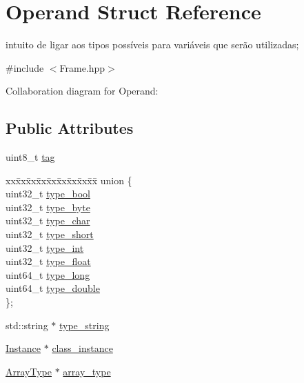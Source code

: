 \hypertarget{struct_operand}{}\section{Operand Struct Reference}
\label{struct_operand}


intuito de ligar aos tipos possíveis para variáveis que serão utilizadas;  




{\ttfamily \#include $<$Frame.\+hpp$>$}



Collaboration diagram for Operand\+:
\subsection*{Public Attributes}
\begin{DoxyCompactItemize}
\item 
uint8\+\_\+t \hyperlink{struct_operand_a551b2888783546b27f90b70f5ceeafee}{tag}
\item 
\begin{tabbing}
xx\=xx\=xx\=xx\=xx\=xx\=xx\=xx\=xx\=\kill
union \{\\
\>uint32\_t \hyperlink{struct_operand_a0705136abc78d06866591f4a1304163b}{type\_bool}\\
\>uint32\_t \hyperlink{struct_operand_a8590d48387a47c99940dec06f4262c88}{type\_byte}\\
\>uint32\_t \hyperlink{struct_operand_a7d323bb935c240911633677c632d967b}{type\_char}\\
\>uint32\_t \hyperlink{struct_operand_a9a95367e26a5d3016da0b6d9fc9f0359}{type\_short}\\
\>uint32\_t \hyperlink{struct_operand_a5aa568fddb9132272a9c4e9870825a13}{type\_int}\\
\>uint32\_t \hyperlink{struct_operand_a323c9442608ba57c5556a67dece11c92}{type\_float}\\
\>uint64\_t \hyperlink{struct_operand_acba3d813258f86827e414fb6e6fb6963}{type\_long}\\
\>uint64\_t \hyperlink{struct_operand_a2bae1001957062fa9e95bb13a0afe2a3}{type\_double}\\
\}; \\

\end{tabbing}\item 
std\+::string $\ast$ \hyperlink{struct_operand_ab339ad43cfc3f1c32be042769846f049}{type\+\_\+string}
\item 
\hyperlink{struct_instance}{Instance} $\ast$ \hyperlink{struct_operand_a9afc0307304efd6930acb371bdabe4c2}{class\+\_\+instance}
\item 
\hyperlink{struct_array_type}{Array\+Type} $\ast$ \hyperlink{struct_operand_a79ddf8db90ba729dcee75f0f6669a8ca}{array\+\_\+type}
\end{DoxyCompactItemize}


